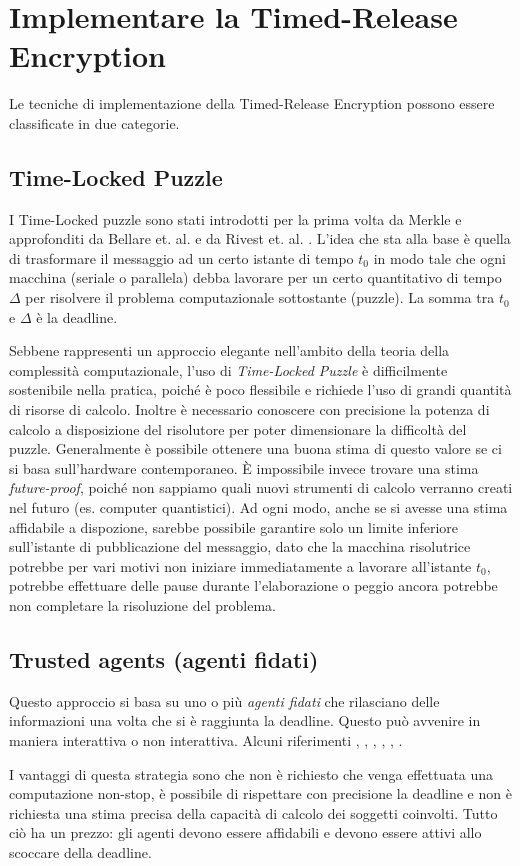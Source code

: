 \section{Implementare la Timed-Release Encryption}
Le tecniche di implementazione della Timed-Release Encryption possono essere classificate
in due categorie.

\subsection{Time-Locked Puzzle}
I Time-Locked puzzle sono stati introdotti per la prima volta
da Merkle \cite{Merkle:1978:SCO:359460.359473} e approfonditi
da Bellare et. al. \cite{Bellare:1996:EKE:888619}
e da Rivest et. al. \cite{Rivest96time-lockpuzzles}.
L'idea che sta alla base è quella di trasformare il messaggio ad un certo istante di tempo $ t_0 $
in modo tale che ogni macchina
(seriale o parallela) debba lavorare per un certo quantitativo di tempo $ \Delta $ per risolvere
il problema computazionale sottostante (puzzle). La somma tra $ t_0 $ e $ \Delta $ è la deadline.

Sebbene rappresenti un approccio elegante nell'ambito della teoria della complessità computazionale,
l'uso di \textit{Time-Locked Puzzle} è difficilmente sostenibile nella pratica,
poiché è poco flessibile e richiede l'uso di
grandi quantità di risorse di calcolo. Inoltre è necessario conoscere con
precisione la potenza di calcolo a disposizione del risolutore per poter
dimensionare la difficoltà del puzzle. Generalmente è possibile ottenere
una buona stima di questo valore se ci si basa sull'hardware contemporaneo. È impossibile
invece trovare una stima \textit{future-proof}, poiché non sappiamo quali nuovi strumenti di
calcolo verranno creati nel futuro (es. computer quantistici).
Ad ogni modo, anche se si avesse una stima affidabile a dispozione,
sarebbe possibile garantire solo un limite inferiore
sull'istante di pubblicazione del messaggio, dato che la macchina risolutrice potrebbe per vari motivi
non iniziare immediatamente a lavorare all'istante $ t_0 $,
potrebbe effettuare delle pause durante l'elaborazione
o peggio ancora potrebbe non completare la risoluzione del problema.


\subsection{Trusted agents (agenti fidati)}
\label{subsec:trusted-agents}
Questo approccio si basa su uno o più \textit{agenti fidati} che rilasciano
delle informazioni una volta che si è raggiunta la deadline. Questo può avvenire in
maniera interattiva o non interattiva. Alcuni riferimenti
\cite{time-capsule-signature}, \cite{10.1007/11602897_25}, \cite{10.1007/3-540-48910-X_6},
\cite{10.1007/11889663_17}, \cite{10.1007/978-3-642-15317-4_1}, \cite{10.1145/1330332.1330336}.

I vantaggi di questa strategia sono che non è richiesto che venga effettuata una computazione non-stop,
è possibile di rispettare con precisione la deadline e non è richiesta una stima precisa
della capacità di calcolo dei soggetti coinvolti. Tutto ciò ha un prezzo: gli agenti devono
essere affidabili e devono essere attivi allo scoccare della deadline.

